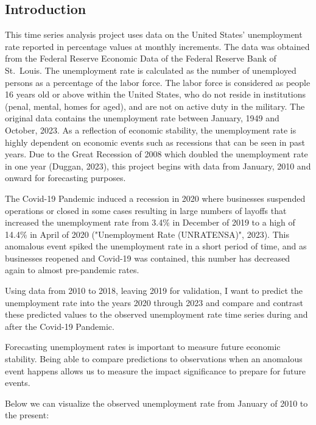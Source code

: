\documentclass[
  letterpaper,
  DIV=11,
  numbers=noendperiod]{scrartcl}
\begin{document}
\hypertarget{introduction}{%
\subsection{Introduction}\label{introduction}}

This time series analysis project uses data on the United States'
unemployment rate reported in percentage values at monthly increments.
The data was obtained from the Federal Reserve Economic Data of the
Federal Reserve Bank of St.~Louis. The unemployment rate is calculated
as the number of unemployed persons as a percentage of the labor force.
The labor force is considered as people 16 years old or above within the
United States, who do not reside in institutions (penal, mental, homes
for aged), and are not on active duty in the military. The original data
contains the unemployment rate between January, 1949 and October, 2023.
As a reflection of economic stability, the unemployment rate is highly
dependent on economic events such as recessions that can be seen in past
years. Due to the Great Recession of 2008 which doubled the unemployment
rate in one year (Duggan, 2023), this project begins with data from
January, 2010 and onward for forecasting purposes.

The Covid-19 Pandemic induced a recession in 2020 where businesses
suspended operations or closed in some cases resulting in large numbers
of layoffs that increased the unemployment rate from 3.4\% in December
of 2019 to a high of 14.4\% in April of 2020 ("Unemployment Rate
(UNRATENSA)", 2023). This anomalous event spiked the unemployment rate
in a short period of time, and as businesses reopened and Covid-19 was
contained, this number has decreased again to almost pre-pandemic rates.

Using data from 2010 to 2018, leaving 2019 for validation, I want to
predict the unemployment rate into the years 2020 through 2023 and
compare and contrast these predicted values to the observed unemployment
rate time series during and after the Covid-19 Pandemic.

Forecasting unemployment rates is important to measure future economic
stability. Being able to compare predictions to observations when an
anomalous event happens allows us to measure the impact significance to
prepare for future events.

Below we can visualize the observed unemployment rate from January of
2010 to the present:
\end{document}
